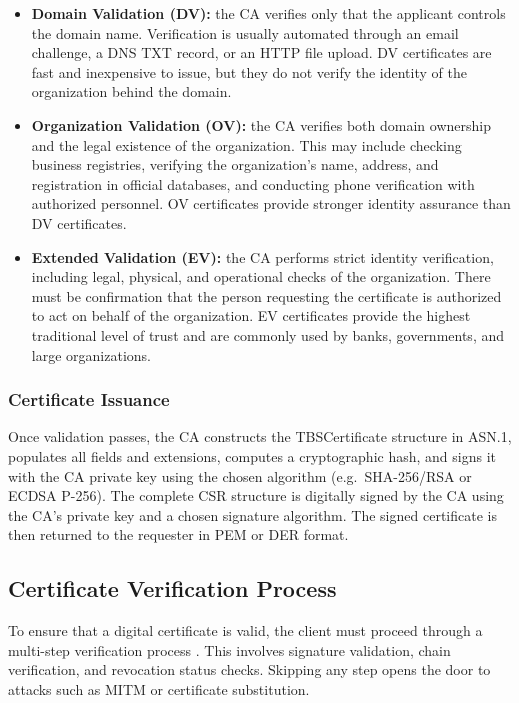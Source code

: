 \documentclass[10pt,twocolumn]{article}
\begin{document}
\begin{itemize}
  \item \textbf{Domain Validation (DV):} the CA verifies only that the
        applicant controls the domain name. Verification is usually automated
        through an email challenge, a DNS TXT record, or an HTTP file upload.
        DV certificates are fast and inexpensive to issue, but they do not
        verify the identity of the organization behind the domain.

  \item \textbf{Organization Validation (OV):} the CA verifies both domain
        ownership and the legal existence of the organization. This may include
        checking business registries, verifying the organization's name,
        address, and registration in official databases, and conducting phone
        verification with authorized personnel. OV certificates provide
        stronger identity assurance than DV certificates.

  \item \textbf{Extended Validation (EV):} the CA performs strict identity
        verification, including legal, physical, and operational checks of the
        organization. There must be confirmation that the person requesting the
        certificate is authorized to act on behalf of the organization. EV
        certificates provide the highest traditional level of trust and are
        commonly used by banks, governments, and large organizations.
\end{itemize}

\subsubsection{Certificate Issuance}

Once validation passes, the CA constructs the TBSCertificate structure in
ASN.1, populates all fields and extensions, computes a cryptographic hash, and
signs it with the CA private key using the chosen algorithm
(e.g.\ SHA-256/RSA or ECDSA P-256). The complete CSR structure is digitally
signed by the CA using the CA's private key and a chosen signature algorithm.
The signed certificate is then returned to the requester in PEM or DER format.

\subsection{Certificate Verification Process}

To ensure that a digital certificate is valid, the client must proceed through
a multi-step verification process \cite{rfc5280}. This involves signature
validation, chain verification, and revocation status checks. Skipping any
step opens the door to attacks such as MITM or certificate substitution.
\end{document}
